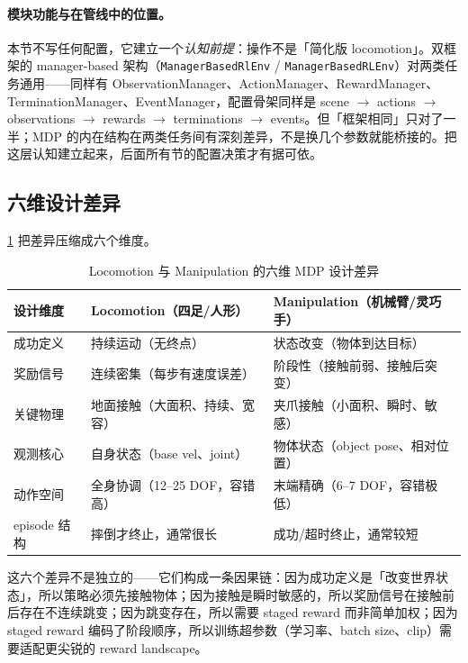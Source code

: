 \paragraph{模块功能与在管线中的位置。}本节不写任何配置，它建立一个\emph{认知前提}：操作不是「简化版 locomotion」。双框架的 manager-based 架构（\verb|ManagerBasedRlEnv| / \verb|ManagerBasedRLEnv|）对两类任务通用——同样有 ObservationManager、ActionManager、RewardManager、TerminationManager、EventManager，配置骨架同样是 scene $\to$ actions $\to$ observations $\to$ rewards $\to$ terminations $\to$ events。但「框架相同」只对了一半；MDP 的内在结构在两类任务间有深刻差异，不是换几个参数就能桥接的。把这层认知建立起来，后面所有节的配置决策才有据可依。

\subsection{六维设计差异}
\label{sec:rlmc-manip-sixdim}

\cref{tab:rlmc-manip-sixdim} 把差异压缩成六个维度。

\begin{table}[ht]
\centering
\small
\caption{Locomotion 与 Manipulation 的六维 MDP 设计差异}
\label{tab:rlmc-manip-sixdim}
\begin{tabular}{@{}lll@{}}
\toprule
设计维度 & Locomotion（四足/人形） & Manipulation（机械臂/灵巧手） \\
\midrule
成功定义 & 持续运动（无终点） & 状态改变（物体到达目标） \\
奖励信号 & 连续密集（每步有速度误差） & 阶段性（接触前弱、接触后突变） \\
关键物理 & 地面接触（大面积、持续、宽容） & 夹爪接触（小面积、瞬时、敏感） \\
观测核心 & 自身状态（base vel、joint） & 物体状态（object pose、相对位置） \\
动作空间 & 全身协调（12--25 DOF，容错高） & 末端精确（6--7 DOF，容错极低） \\
episode 结构 & 摔倒才终止，通常很长 & 成功/超时终止，通常较短 \\
\bottomrule
\end{tabular}
\end{table}

这六个差异不是独立的——它们构成一条因果链：因为成功定义是「改变世界状态」，所以策略必须先接触物体；因为接触是瞬时敏感的，所以奖励信号在接触前后存在不连续跳变；因为跳变存在，所以需要 staged reward 而非简单加权；因为 staged reward 编码了阶段顺序，所以训练超参数（学习率、batch size、clip）需要适配更尖锐的 reward landscape。

